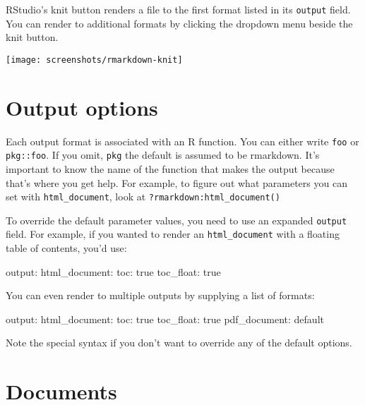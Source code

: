 \documentclass[]{book}
\newenvironment{Shaded}{\begin{snugshade}}{\end{snugshade}}
\newcommand{\FunctionTok}[1]{\textcolor[rgb]{0.00,0.00,0.00}{{#1}}}
\newcommand{\NormalTok}[1]{{#1}}
\begin{document}
RStudio's knit button renders a file to the first format listed in its
\texttt{output} field. You can render to additional formats by clicking
the dropdown menu beside the knit button.

\begin{center}\texttt{[image: screenshots/rmarkdown-knit]} \end{center}

\section{Output options}\label{output-options}

Each output format is associated with an R function. You can either
write \texttt{foo} or \texttt{pkg::foo}. If you omit, \texttt{pkg} the
default is assumed to be rmarkdown. It's important to know the name of
the function that makes the output because that's where you get help.
For example, to figure out what parameters you can set with
\texttt{html\_document}, look at \texttt{?rmarkdown:html\_document()}

To override the default parameter values, you need to use an expanded
\texttt{output} field. For example, if you wanted to render an
\texttt{html\_document} with a floating table of contents, you'd use:

\begin{Shaded}
\begin{Highlighting}[]
\FunctionTok{output:}
  \FunctionTok{html_document:}
    \FunctionTok{toc:} \NormalTok{true}
    \FunctionTok{toc_float:} \NormalTok{true}
\end{Highlighting}
\end{Shaded}

You can even render to multiple outputs by supplying a list of formats:

\begin{Shaded}
\begin{Highlighting}[]
\FunctionTok{output:}
  \FunctionTok{html_document:}
    \FunctionTok{toc:} \NormalTok{true}
    \FunctionTok{toc_float:} \NormalTok{true}
  \FunctionTok{pdf_document:} \NormalTok{default}
\end{Highlighting}
\end{Shaded}

Note the special syntax if you don't want to override any of the default
options.

\section{Documents}\label{documents}
\end{document}
